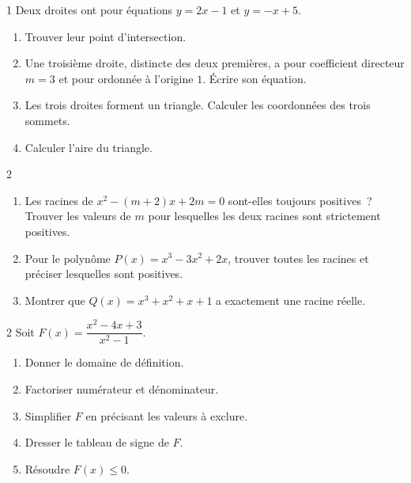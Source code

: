 \begin{probleme}{1}
Deux droites ont pour \'equations $y = 2x - 1$ et $y = -x + 5$.
\begin{enumerate}
  \item Trouver leur point d'intersection.
  \item Une troisi\`eme droite, distincte des deux premi\`eres, a pour coefficient
        directeur $m=3$ et pour ordonn\'ee \`a l'origine $1$. \'Ecrire son \'equation.
  \item Les trois droites forment un triangle.
        Calculer les coordonn\'ees des trois sommets.
  \item Calculer l'aire du triangle.
\end{enumerate}
\end{probleme}

\begin{probleme}{2}
\begin{enumerate}
  \item Les racines de $x^2 - (m+2)x + 2m = 0$ sont-elles toujours
        positives~? Trouver les valeurs de $m$ pour lesquelles les deux
        racines sont strictement positives.
  \item Pour le polyn\^ome $P(x) = x^3 - 3x^2 + 2x$, trouver toutes les
        racines et pr\'eciser lesquelles sont positives.
  \item Montrer que $Q(x) = x^3 + x^2 + x + 1$ a exactement une racine r\'eelle.
\end{enumerate}
\end{probleme}

\begin{probleme}{2}
Soit $F(x) = \dfrac{x^2-4x+3}{x^2-1}$.
\begin{enumerate}
  \item Donner le domaine de d\'efinition.
  \item Factoriser num\'erateur et d\'enominateur.
  \item Simplifier $F$ en pr\'ecisant les valeurs \`a exclure.
  \item Dresser le tableau de signe de $F$.
  \item R\'esoudre $F(x) \leq 0$.
\end{enumerate}
\end{probleme}

